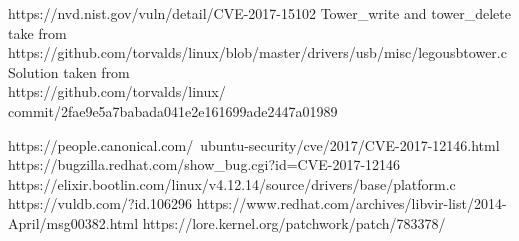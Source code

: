 \documentclass[12pt]{article}
\begin{document}
\begin{thebibliography}{9}
	https://nvd.nist.gov/vuln/detail/CVE-2017-15102
	Tower\_write and tower\_delete take from\\ 
	https://github.com/torvalds/linux/blob/master/drivers/usb/misc/legousbtower.c
	Solution taken from\\
	https://github.com/torvalds/linux/\\commit/2fae9e5a7babada041e2e161699ade2447a01989

https://people.canonical.com/~ubuntu-security/cve/2017/CVE-2017-12146.html
https://bugzilla.redhat.com/show\_bug.cgi?id=CVE-2017-12146
https://elixir.bootlin.com/linux/v4.12.14/source/drivers/base/platform.c
https://vuldb.com/?id.106296
https://www.redhat.com/archives/libvir-list/2014-April/msg00382.html
https://lore.kernel.org/patchwork/patch/783378/
\end{thebibliography}
\end{document}

